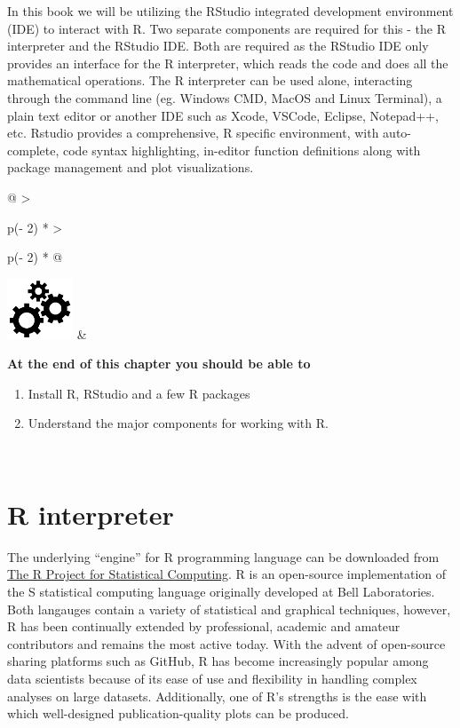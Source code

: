 \documentclass[
]{book}
\begin{document}
In this book we will be utilizing the RStudio integrated development environment (IDE) to interact with R. Two separate components are required for this - the R interpreter and the RStudio IDE. Both are required as the RStudio IDE only provides an interface for the R interpreter, which reads the code and does all the mathematical operations. The R interpreter can be used alone, interacting through the command line (eg. Windows CMD, MacOS and Linux Terminal), a plain text editor or another IDE such as Xcode, VSCode, Eclipse, Notepad++, etc. Rstudio provides a comprehensive, R specific environment, with auto-complete, code syntax highlighting, in-editor function definitions along with package management and plot visualizations.

\hfill\break

\begin{longtable}[]{@{}
  >{\raggedright\arraybackslash}p{(\columnwidth - 2\tabcolsep) * }
  >{\raggedright\arraybackslash}p{(\columnwidth - 2\tabcolsep) * }@{}}
\toprule\noalign{}
\endhead
\bottomrule\noalign{}
\endlastfoot
\includegraphics[width=\textwidth,height=0.70833in]{images/03.png} & \begin{minipage}[t]{\linewidth}\raggedright
\textbf{At the end of this chapter you should be able to}

\begin{enumerate}
\def\labelenumi{\arabic{enumi}.}
\item
  Install R, RStudio and a few R packages
\item
  Understand the major components for working with R.
\end{enumerate}
\end{minipage} \\
\end{longtable}

\hfill\break

\hypertarget{r-interpreter}{%
\section{R interpreter}\label{r-interpreter}}

The underlying ``engine'' for R programming language can be downloaded from \href{https://www.r-project.org/}{The R Project for Statistical Computing}. R is an open-source implementation of the S statistical computing language originally developed at Bell Laboratories. Both langauges contain a variety of statistical and graphical techniques, however, R has been continually extended by professional, academic and amateur contributors and remains the most active today. With the advent of open-source sharing platforms such as GitHub, R has become increasingly popular among data scientists because of its ease of use and flexibility in handling complex analyses on large datasets. Additionally, one of R's strengths is the ease with which well-designed publication-quality plots can be produced.
\end{document}
